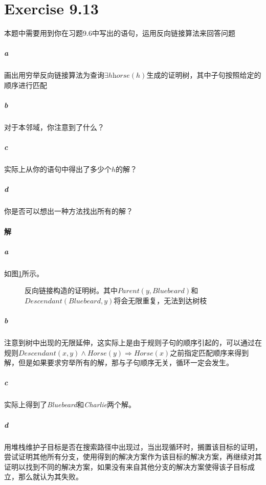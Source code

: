\documentclass{article}
\begin{document}
\section{Exercise 9.13}
本题中需要用到你在习题9.6中写出的语句，运用反向链接算法来回答问题
\subparagraph{a} 画出用穷举反向链接算法为查询$\exists h \textit{horse}(h)$生成的证明树，其中子句按照给定的顺序进行匹配
\subparagraph{b} 对于本邻域，你注意到了什么？
\subparagraph{c} 实际上从你的语句中得出了多少个$h$的解？
\subparagraph{d} 你是否可以想出一种方法找出所有的解？

\paragraph{解}
\subparagraph{a}
如图\ref{figure:1}所示。
\begin{figure}[h]
    \centering
    \caption{反向链接构造的证明树。其中$\textit{Parent}(y, \textit{Bluebeard})$和$\textit{Descendant}(\textit{Bluebeard}, y)$将会无限重复，无法到达树枝}
    \label{figure:1}
\end{figure}

\subparagraph{b}
注意到树中出现的无限延伸，这实际上是由于规则子句的顺序引起的，可以通过在规则$\textit{Descendant}(x, y) \land \textit{Horse}(y) \Rightarrow \textit{Horse}(x)$之前指定匹配顺序来得到解，但是如果要求穷举所有的解，那与子句顺序无关，循环一定会发生。

\subparagraph{c}
实际上得到了\textit{Bluebeard}和\textit{Charlie}两个解。

\subparagraph{d}
用堆栈维护子目标是否在搜索路径中出现过，当出现循环时，搁置该目标的证明，尝试证明其他所有分支，使用得到的解决方案作为该目标的解决方案，再继续对其证明以找到不同的解决方案，如果没有来自其他分支的解决方案使得该子目标成立，那么就认为其失败。
\end{document}
